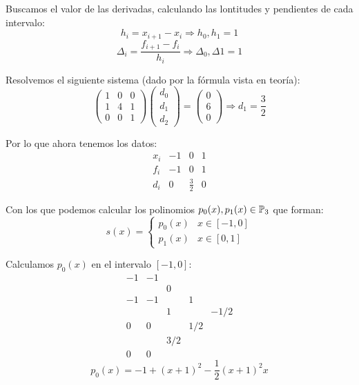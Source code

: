 \bigskip
\noindent
Buscamos el valor de las derivadas, calculando las lontitudes y pendientes de cada intervalo:
$$h_i = x_{i+1}-x_i \Rightarrow h_0,h_1=1$$
$$\Delta_i = \dfrac{f_{i+1}-f_i}{h_i} \Rightarrow \Delta_0,\Delta1 = 1$$

\noindent
Resolvemos el siguiente sistema (dado por la fórmula vista en teoría):
$$\left( \begin{array}{ccc}
            1 & 0 & 0 \\
            1 & 4 & 1 \\
            0 & 0 & 1
        \end{array} \right) \left( \begin{array}{c}
            d_0 \\
            d_1 \\
            d_2
        \end{array} \right) = \left( \begin{array}{c}
            0 \\
            6 \\
            0
        \end{array} \right) \Rightarrow d_1 = \dfrac{3}{2}$$

\noindent
Por lo que ahora tenemos los datos:
$$\begin{array}{c|ccc}
        x_i & -1 & 0           & 1 \\
        \hline
        f_i & -1 & 0           & 1 \\
        \hline
        d_i & 0  & \frac{3}{2} & 0
    \end{array}$$

\noindent
Con los que podemos calcular los polinomios $p_0(x), p_1(x) \in \mathbb{P}_3$ que forman:
$$s(x) = \left\{ \begin{array}{ll}
        p_0(x) & x \in [-1, 0] \\
        p_1(x) & x \in [0,1]
    \end{array} \right.$$

\noindent
Calculamos $p_0(x)$ en el intervalo $[-1,0]$:
$$\begin{array}{c|cccc}
        -1 & -1 &     &     &      \\
           &    & 0   &     &      \\
        -1 & -1 &     & 1   &      \\
           &    & 1   &     & -1/2 \\
        0  & 0  &     & 1/2 &      \\
           &    & 3/2 &     &      \\
        0  & 0  &     &     &
    \end{array}$$
$$p_0(x) = -1 + (x+1)^2 -\dfrac{1}{2}(x+1)^2x$$


